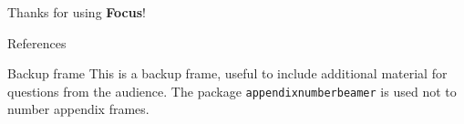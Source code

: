 \documentclass[aspectratio=169]{beamer}
\begin{document}
    \begin{frame}[focus]
        Thanks for using \textbf{Focus}!
    \end{frame}
    
    \appendix
    \begin{frame}{References}
        \nocite{*}
        
        
    \end{frame}
    
    \begin{frame}{Backup frame}
        This is a backup frame, useful to include additional material for questions from the audience.
        \vfill
        The package \texttt{appendixnumberbeamer} is used not to number appendix frames.
    \end{frame}
\end{document}
